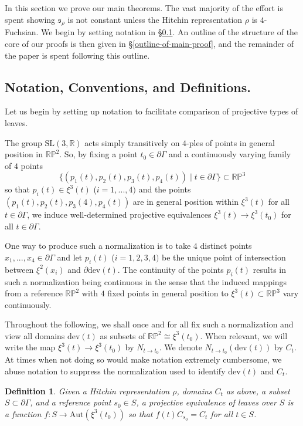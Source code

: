 \documentclass[12pt,a4paper]{amsart}
\newcommand{\bbR}{\mathbb R}
\theoremstyle{definition}
\theoremstyle{plain}
\newtheorem{definition}[theorem]{Definition}
\numberwithin{equation}{section}
\begin{document}
In this section we prove our main theorems. The vast majority of the effort is spent showing $\mathfrak{s}_\rho$ is not constant unless the Hitchin representation $\rho$ is $4$-Fuchsian. We begin by setting notation in \S \ref{notations-conventions-definitions}. An outline of the structure of the core of our proofs is then given in \S \ref{outline-of-main-proof}, and the remainder of the paper is spent following this outline.

\subsection{Notation, Conventions, and Definitions.}\label{notations-conventions-definitions}
Let us begin by setting up notation to facilitate comparison of projective types of leaves.

The group $\text{SL}(3,\bbR)$ acts simply transitively on $4$-ples of points in general position in $\mathbb{RP}^2$. So, by fixing a point $t_0 \in \partial \Gamma$ and a continuously varying family of $4$ points $$\{(p_1(t), p_2(t), p_3(t), p_4(t)) \mid  t \in \partial \Gamma \} \subset \mathbb{RP}^3$$ so that $p_i(t) \in \xi^3(t)$ ($i=1,...,4)$ and the points $(p_1(t), p_2(t), p_3(4), p_4(t))$ are in general position within $\xi^3(t)$ for all $t \in \partial \Gamma$, we induce well-determined projective equivalences $\xi^3(t) \to \xi^3(t_0)$ for all $t \in \partial \Gamma$.

One way to produce such a normalization is to take $4$ distinct points $x_1, ..., x_4 \in \partial\Gamma$ and let $p_i(t)$ ($i =1,2,3,4)$ be the unique point of intersection between $\xi^2(x_i)$ and $\partial \text{dev}(t)$. The continuity of the points $p_i(t)$ results in such a normalization being continuous in the sense that the induced mappings from a reference $\mathbb{RP}^2$ with $4$ fixed points in general position to $\xi^3(t) \subset \mathbb{RP}^3$ vary continuously.

Throughout the following, we shall once and for all fix such a normalization and view all domains ${\text{dev}(t)}$ as subsets of $\mathbb{RP}^2 \cong \xi^3(t_0)$. When relevant, we will write the map $\xi^3(t) \to \xi^3(t_0)$ by $N_{t \to t_0}$. We denote $N_{t \to t_0}(\text{dev}(t))$ by $C_t$. At times when not doing so would make notation extremely cumbersome, we abuse notation to suppress the normalization used to identify $\text{dev}(t)$ and $C_t$.

\begin{definition}
    Given a Hitchin representation $\rho$, domains $C_t$ as above, a subset $S \subset \partial \Gamma$, and a reference point $s_0 \in S$, a {\rm{projective equivalence of leaves over}} $S$ is a function {\rm{$f: S \to \text{Aut}(\xi^3(t_0))$}} so that $f(t)C_{s_0} = C_t$ for all $t \in S$.
\end{definition}
\end{document}
